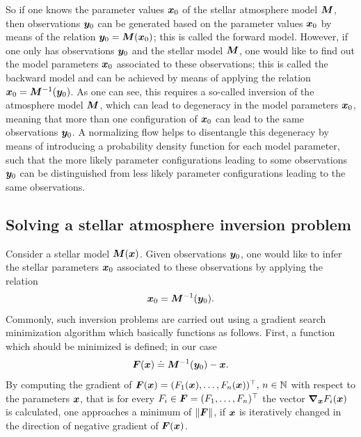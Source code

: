 \documentclass[a4paper,12pt]{report}
\begin{document}
So if one knows the parameter values $\bm{x}_0$ of the stellar atmosphere model $\bm{M}$, then observations $\bm{y}_0$ can be generated based on the parameter values $\bm{x}_0$ by means of the relation $\bm{y}_0 = \bm{M}(\bm{x}_0)$; this is called the forward model. However, if one only has observations $\bm{y}_0$ and the stellar model $\bm{M}$, one would like to find out the model parameters $\bm{x}_0$ associated to these observations; this is called the backward model and can be achieved by means of applying the relation $\bm{x}_0 = \bm{M}^{-1}(\bm{y}_0)$. As one can see, this requires a so-called inversion of the atmosphere model $\bm{M}$, which can lead to degeneracy in the model parameters $\bm{x}_0$, meaning that more than one configuration of $\bm{x}_0$ can lead to the same observations $\bm{y}_0$. A normalizing flow helps to disentangle this degeneracy by means of introducing a probability density function for each model parameter, such that the more likely parameter configurations leading to some observations $\bm{y}_0$ can be distinguished from less likely parameter configurations leading to the same observations.

\subsection{Solving a stellar atmosphere inversion problem}
Consider a stellar model $\bm{M}(\bm{x})$. Given observations $\bm{y}_0$, one would like to infer the stellar parameters $\bm{x}_0$ associated to these observations by applying the relation \begin{equation}
\bm{x}_0 = \bm{M}^{-1}(\bm{y}_0).
\end{equation} Commonly, such inversion problems are carried out using a gradient search minimization algorithm which basically functions as follows. First, a function which should be minimized is defined; in our case \begin{equation}
\bm{F}(\bm{x}) \doteq \bm{M}^{-1}(\bm{y}_0) - \bm{x}.
\end{equation} By computing the gradient of $\bm{F}(\bm{x}) = (F_1(\bm{x}), \dots, F_n(\bm{x}))^\top,\,n\in\mathbb{N}$ with respect to the parameters $\bm{x}$, that is for every $F_i \in \bm{F} = (F_1,\dots,F_n)^\top$ the vector $\bm{\nabla}_{\bm{x}}F_i(\bm{x})$ is calculated, one approaches a minimum of $\|\bm{F}\|$, if $\bm{x}$ is iteratively changed in the direction of negative gradient of $\bm{F}(\bm{x})$.
\end{document}
